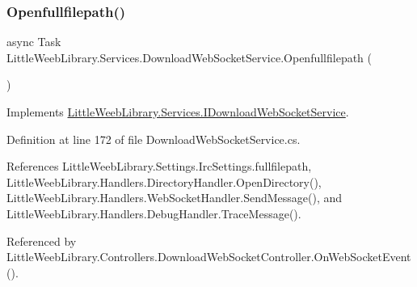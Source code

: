 \mbox{\label{class_little_weeb_library_1_1_services_1_1_download_web_socket_service_a6f2201dd7b86f142c2e901262ea53fbe}} 
\subsubsection{\texorpdfstring{Openfullfilepath()}{Openfullfilepath()}}
{\footnotesize\ttfamily async Task Little\+Weeb\+Library.\+Services.\+Download\+Web\+Socket\+Service.\+Openfullfilepath (\begin{DoxyParamCaption}{ }\end{DoxyParamCaption})}



Implements \mbox{\hyperlink{interface_little_weeb_library_1_1_services_1_1_i_download_web_socket_service_aa979c5549b6523e88fd8050a684ee493}{Little\+Weeb\+Library.\+Services.\+I\+Download\+Web\+Socket\+Service}}.



Definition at line 172 of file Download\+Web\+Socket\+Service.\+cs.



References Little\+Weeb\+Library.\+Settings.\+Irc\+Settings.\+fullfilepath, Little\+Weeb\+Library.\+Handlers.\+Directory\+Handler.\+Open\+Directory(), Little\+Weeb\+Library.\+Handlers.\+Web\+Socket\+Handler.\+Send\+Message(), and Little\+Weeb\+Library.\+Handlers.\+Debug\+Handler.\+Trace\+Message().



Referenced by Little\+Weeb\+Library.\+Controllers.\+Download\+Web\+Socket\+Controller.\+On\+Web\+Socket\+Event().


